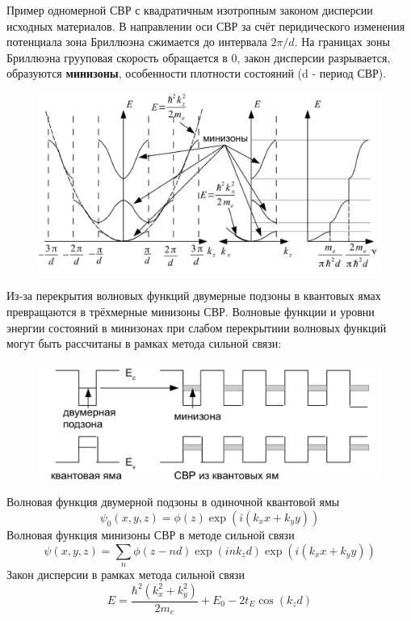 Пример одномерной СВР с квадратичным изотропным законом дисперсии
исходных материалов. В направлении оси СВР за счёт перидического изменения потенциала зона Бриллюэна сжимается до интервала $2\pi / d$. На границах зоны Бриллюэна грууповая скорость обращается в 0, закон дисперсии разрывается, образуются \textbf{минизоны}, особенности плотности состояний (d - период СВР).
\begin{figure}[h!]
\centering
 \includegraphics[width=\textwidth]{images/ph30.6.jpg}
\end{figure}

Из-за перекрытия волновых функций двумерные подзоны в квантовых
ямах превращаются в трёхмерные минизоны СВР. Волновые функции и
уровни энергии состояний в минизонах при слабом перекрытиии волновых
функций могут быть рассчитаны в рамках метода сильной связи:
\begin{figure}[h!]
\centering
 \includegraphics[width=\textwidth]{images/ph30.7.jpg}
\end{figure}


Волновая функция двумерной подзоны в одиночной квантовой ямы
$$
\psi_0(x, y, z)=\phi(z) \exp \left(i\left(k_x x+k_y y\right)\right)
$$
Волновая функция минизоны СВР в методе сильной связи
$$
\psi(x, y, z)=\sum_n \phi(z-n d) \exp \left(i n k_z d\right) \exp \left(i\left(k_x x+k_y y\right)\right)
$$
Закон дисперсии в рамках метода сильной связи
$$
E=\frac{\hbar^2\left(k_x^2+k_y^2\right)}{2 m_e}+E_0-2 t_E \cos \left(k_z d\right)
$$


